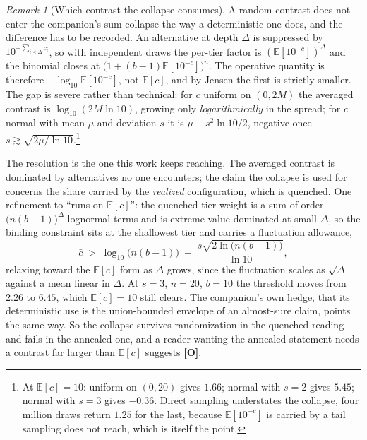 \documentclass[11pt]{article}
\newcommand{\E}{\mathbb{E}}
\theoremstyle{plain}
\theoremstyle{definition}
\theoremstyle{remark}
\newtheorem{remark}[theorem]{Remark}
\begin{document}
\begin{remark}[Which contrast the collapse consumes]\label{sch:rem:n2}
A random contrast does not enter the companion's sum-collapse the way a
deterministic one does, and the difference has to be recorded. An alternative at depth $\Delta$ is suppressed by
$10^{-\sum_{i\le\Delta}c_i}$, so with independent draws the per-tier
factor is $(\E[10^{-c}])^{\Delta}$ and the binomial closes at
$\bigl(1+(b-1)\E[10^{-c}]\bigr)^{n}$. The operative quantity is
therefore $-\log_{10}\E[10^{-c}]$, not $\E[c]$, and by Jensen the first
is strictly smaller. The gap is severe rather than technical: for $c$
uniform on $(0,2M)$ the averaged contrast is $\log_{10}(2M\ln10)$,
growing only \emph{logarithmically} in the spread; for $c$ normal with
mean $\mu$ and deviation $s$ it is $\mu-s^{2}\ln10/2$, negative once
$s\gtrsim\sqrt{2\mu/\ln10}$.\footnote{At $\E[c]=10$: uniform on
$(0,20)$ gives $1.66$; normal with $s=2$ gives $5.45$; normal with $s=3$
gives $-0.36$. Direct sampling understates the collapse, four million
draws return $1.25$ for the last, because $\E[10^{-c}]$ is carried by
a tail sampling does not reach, which is itself the point.}

The resolution is the one this work keeps reaching. The averaged
contrast is dominated by alternatives no one encounters; the claim the
collapse is used for concerns the share carried by the \emph{realized}
configuration, which is quenched. One refinement to ``runs on $\E[c]$'':
the quenched tier weight is a sum of order $\bigl(n(b-1)\bigr)^{\Delta}$
lognormal terms and is extreme-value dominated at small $\Delta$, so the
binding constraint sits at the shallowest tier and carries a fluctuation
allowance,
\begin{equation}\label{sch:eq:quenchedcrit}
\bar c\;>\;\log_{10}\bigl(n(b-1)\bigr)
\;+\;\frac{s\sqrt{2\ln\bigl(n(b-1)\bigr)}}{\ln10},
\end{equation}
relaxing toward the $\E[c]$ form as $\Delta$ grows, since the fluctuation
scales as $\sqrt\Delta$ against a mean linear in $\Delta$. At $s=3$,
$n=20$, $b=10$ the threshold moves from $2.26$ to $6.45$, which
$\E[c]=10$ still clears. The companion's
own hedge, that its deterministic use is the union-bounded envelope
of an almost-sure claim, points the same way. So the collapse
survives randomization in the quenched reading and fails in the annealed
one, and a reader wanting the annealed statement needs a contrast far
larger than $\E[c]$ suggests \textbf{[O]}.
\end{remark}
\end{document}
